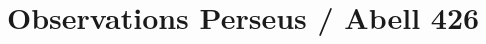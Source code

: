\documentclass[11pt,a4paper]{article}
\begin{document}

\section*{Observations Perseus / Abell 426}

\end{document}
